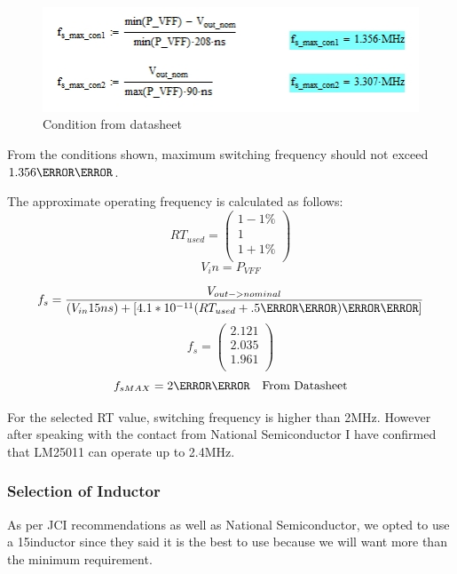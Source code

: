 \begin{figure}[htbp]
\begin{center}
\includegraphics[width=6in]{includes/freq}
\caption{Condition from datasheet}
\end{center}
\end{figure}

From the conditions shown, maximum switching frequency should not exceed $1.356 \mega\hertz$.

The approximate operating frequency is calculated as follows:
\begin{equation}
RT_{used}=\left( \begin{array}{ccc}
1-1\percent \\ 1 \\ 1+1\percent \\
\end{array} \right)
\end{equation}
\begin{equation}
V_in=P_{VFF}
\end{equation}

\begin{equation}
f_s=\frac{V_{out->nominal}}{(V_{in}15ns)+[4.1*10^{-11}(RT_{used}+.5\kilo\ohm)\ampere\second]}
\end{equation}
\begin{equation}
f_s=\left( \begin{array}{ccc}
2.121 \\ 2.035 \\ 1.961 \\ 
\end{array} \right)
\end{equation}
\begin{equation}
f_{sMAX}=2\mega\hertz \quad \hbox{From Datasheet}
\end{equation}

For the selected RT value, switching frequency is higher than 2MHz. However after speaking with the contact from National Semiconductor I have confirmed that LM25011 can operate up to 2.4MHz.

\subsubsection{Selection of Inductor}
As per JCI recommendations as well as National Semiconductor, we opted to use a 15\micro\henry inductor since they said it is the best to use because we will want more than the minimum requirement. 

